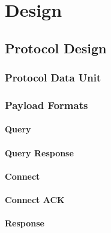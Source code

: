 \documentclass{l4proj}
\begin{document}
\chapter{Design} %
\label{cha:design}


\section{Protocol Design} %
\label{sec:protocol_design}


\subsection{Protocol Data Unit} %
\label{sub:protocol_data_unit}


\subsection{Payload Formats} %
\label{sub:payload_formats}

\subsubsection{Query} %
\label{ssub:query}
		

\subsubsection{Query Response} %
\label{ssub:query_response}


\subsubsection{Connect} %
\label{ssub:connect}


\subsubsection{Connect ACK} %
\label{ssub:connect_ack}


\subsubsection{Response} %
\label{ssub:response}
\end{document}

